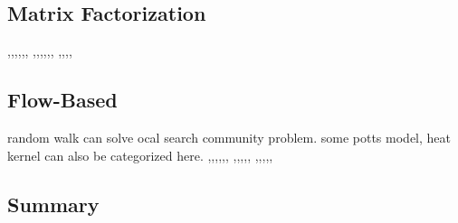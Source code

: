 \subsection{Matrix Factorization}
\cite{kuang2012symmetric},\cite{kuang2015symnmf},\cite{yang2013overlapping},\cite{ye2018deep},\cite{zhang2012overlapping},\cite{zhang2013overlapping},
\cite{wu2018nonnegative},\cite{psorakis2011overlapping},\cite{chakraborty2015nonnegative},\cite{huang2018robust},\cite{pei2015nonnegative},\cite{wang2011community},
\cite{yang2012clustering},\cite{liu2017semi},\cite{shang2012graph},\cite{shi2015community},\cite{tang2014uncovering}



\subsection{Flow-Based}
random walk can solve ocal search community problem. some potts model, heat kernel can also be categorized here.
\cite{rosvall2011multilevel},\cite{rosvall2014memory},\cite{persson2016maps},\cite{rosvall2008maps},\cite{jin2011markov},\cite{kloster2014heat},
\cite{zlatic2010topologically},,\cite{he2018network},\cite{salnikov2016using},\cite{orecchia2014flow},
\cite{liu2010detecting},\cite{li2012potts},\cite{lambiotte2012ranking},\cite{yang2014closed},\cite{wang2013fuzzy},


\subsection{Summary}
